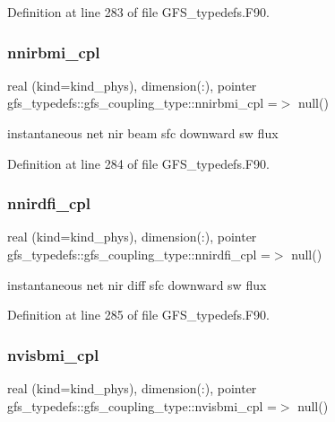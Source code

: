 Definition at line 283 of file G\+F\+S\+\_\+typedefs.\+F90.

\mbox{\label{structgfs__typedefs_1_1gfs__coupling__type_a602547ea64ac79280d5ce48bd0f4ec06}} 
\subsubsection{nnirbmi\+\_\+cpl}
{\footnotesize\ttfamily real (kind=kind\+\_\+phys), dimension(\+:), pointer gfs\+\_\+typedefs\+::gfs\+\_\+coupling\+\_\+type\+::nnirbmi\+\_\+cpl =$>$ null()}



instantaneous net nir beam sfc downward sw flux 



Definition at line 284 of file G\+F\+S\+\_\+typedefs.\+F90.

\mbox{\label{structgfs__typedefs_1_1gfs__coupling__type_a47f6a3577bc36a261d9e2141962ca730}} 
\subsubsection{nnirdfi\+\_\+cpl}
{\footnotesize\ttfamily real (kind=kind\+\_\+phys), dimension(\+:), pointer gfs\+\_\+typedefs\+::gfs\+\_\+coupling\+\_\+type\+::nnirdfi\+\_\+cpl =$>$ null()}



instantaneous net nir diff sfc downward sw flux 



Definition at line 285 of file G\+F\+S\+\_\+typedefs.\+F90.

\mbox{\label{structgfs__typedefs_1_1gfs__coupling__type_a4ba650a651309ebd6be6c92721fdfd6d}} 
\subsubsection{nvisbmi\+\_\+cpl}
{\footnotesize\ttfamily real (kind=kind\+\_\+phys), dimension(\+:), pointer gfs\+\_\+typedefs\+::gfs\+\_\+coupling\+\_\+type\+::nvisbmi\+\_\+cpl =$>$ null()}



